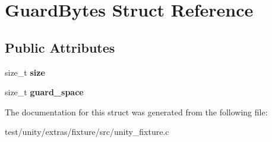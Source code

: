 \hypertarget{structGuardBytes}{}\section{Guard\+Bytes Struct Reference}
\label{structGuardBytes}
\subsection*{Public Attributes}
\begin{DoxyCompactItemize}
\item 
\mbox{\label{structGuardBytes_aaaa61ece04c10796769dfb24d15227dc}} 
size\+\_\+t {\bfseries size}
\item 
\mbox{\label{structGuardBytes_a96585124a68487455e7fc4990680fbdb}} 
size\+\_\+t {\bfseries guard\+\_\+space}
\end{DoxyCompactItemize}


The documentation for this struct was generated from the following file\+:\begin{DoxyCompactItemize}
\item 
test/unity/extras/fixture/src/unity\+\_\+fixture.\+c\end{DoxyCompactItemize}
